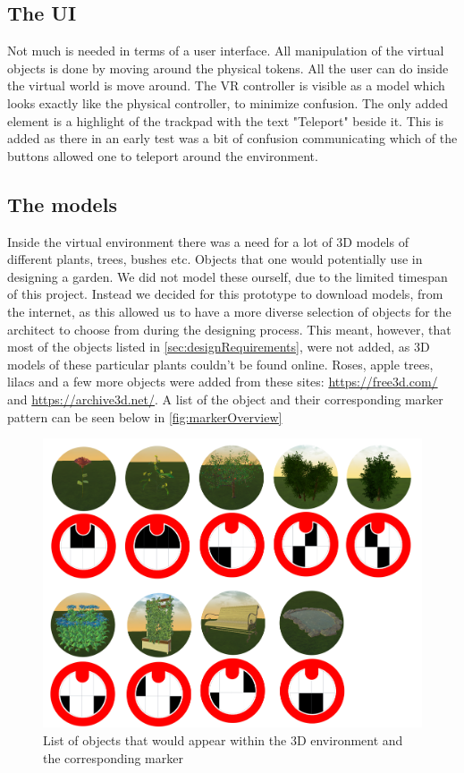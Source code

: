 \subsection{The UI}
Not much is needed in terms of a user interface. All manipulation of the virtual objects is done by moving around the physical tokens. All the user can do inside the virtual world is move around. The VR controller is visible as a model which looks exactly like the physical controller, to minimize confusion. The only added element is a highlight of the trackpad with the text "Teleport" beside it. This is added as there in an early test was a bit of confusion communicating which of the buttons allowed one to teleport around the environment.

\subsection{The models}
Inside the virtual environment there was a need for a lot of 3D models of different plants, trees, bushes etc. Objects that one would potentially use in designing a garden. We did not model these ourself, due to the limited timespan of this project. Instead we decided for this prototype to download models, from the internet, as this allowed us to have a more diverse selection of objects for the architect to choose from during the designing process. This meant, however, that most of the objects listed in \autoref{sec:designRequirements}, were not added, as 3D models of these particular plants couldn't be found online. Roses, apple trees, lilacs and a few more objects were added from these sites: \url{https://free3d.com/} and \url{https://archive3d.net/}. A list of the object and their corresponding marker pattern can be seen below in \autoref{fig:markerOverview}

\begin{figure}[H]
	\centering
	\includegraphics[width=0.9\linewidth]{figure/Appendices/markersOverview.png}
	\caption{List of objects that would appear within the 3D environment and the corresponding marker}
	\label{fig:markerOverview}
\end{figure}









